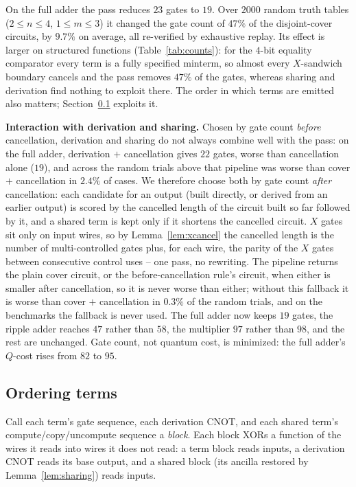 \documentclass[conference]{IEEEtran}
\theoremstyle{plain}
\begin{document}
On the full adder the pass reduces $23$ gates to $19$. Over $2000$ random
truth tables ($2\le n\le 4$, $1\le m\le 3$) it changed the gate count of
$47\%$ of the disjoint-cover circuits, by $9.7\%$ on average, all
re-verified by exhaustive replay.
Its effect is larger on structured functions (Table~\ref{tab:counts}):
for the $4$-bit equality comparator every term is a fully specified
minterm, so almost every $X$-sandwich boundary cancels and the pass
removes $47\%$ of the gates, whereas sharing and derivation find nothing
to exploit there. The order in which terms are emitted also matters;
Section~\ref{sec:order} exploits it.

\textbf{Interaction with derivation and sharing.} Chosen by gate count
\emph{before} cancellation, derivation and sharing do not always combine
well with the pass: on the full adder, derivation $+$ cancellation gives
$22$ gates, worse than cancellation alone ($19$), and across the random
trials above that pipeline was worse than cover $+$ cancellation in
$2.4\%$ of cases. We therefore choose both by gate count \emph{after}
cancellation: each candidate for an output (built directly, or derived
from an earlier output) is scored by the cancelled length of the circuit
built so far followed by it, and a shared term is kept only if it
shortens the cancelled circuit. $X$ gates sit only on input wires, so by
Lemma~\ref{lem:xcancel} the cancelled length is the number of
multi-controlled gates plus, for each wire, the parity of the $X$ gates
between consecutive control uses -- one pass, no rewriting. The pipeline
returns the plain cover circuit, or the before-cancellation rule's
circuit, when either is smaller after cancellation, so it is never worse
than either; without this fallback it is worse than cover $+$
cancellation in $0.3\%$ of the random trials, and on the benchmarks the
fallback is never used. The full adder now keeps $19$ gates, the ripple
adder reaches $47$ rather than $58$, the multiplier $97$ rather than $98$,
and the rest are unchanged. Gate count, not quantum cost, is minimized:
the full adder's $Q$-cost rises from $82$ to $95$.

\subsection{Ordering terms}
\label{sec:order}
Call each term's gate sequence, each derivation CNOT, and each shared
term's compute/copy/uncompute sequence a \emph{block}. Each block XORs a
function of the wires it reads into wires it does not read: a term block
reads inputs, a derivation CNOT reads its base output, and a shared block
(its ancilla restored by Lemma~\ref{lem:sharing}) reads inputs.
\end{document}
